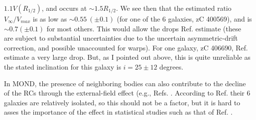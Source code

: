 \documentclass[twocolumn,showpacs,amsmath,amssymb,prd,nofootinbib]
{revtex4}
\def\sss{\scriptscriptstyle}
\def\_#1{_{\sss #1}}
\def\vinf{V_{\infty}}
\def\raf{R\_{1/2}}
\begin{document}
$1.1V(\raf)$, and occurs at $\sim 1.5 \raf$. We see then that the estimated ratio $\vinf/V_{max}$ is as low as $\sim 0.55~ (\pm 0.1)$ (for one of the 6 galaxies, zC 400569), and is $\sim 0.7 (\pm 0.1)$ for most others. This would allow the drops Ref. \cite{genzel17} estimate (these are subject to substantial uncertainties due to the uncertain asymmetric-drift correction, and possible unaccounted for warps). For one galaxy, zC 406690, Ref. \cite{genzel17} estimate a very large drop. But, as I pointed out above, this is quite unreliable as the stated inclination for this galaxy is $i=25\pm 12$ degrees.
\par
In MOND, the presence of neighboring bodies can also contribute to the decline of the RCs through the external-field effect (e.g., Refs. \cite{milgrom83a,wu15,haghi16,mcgaugh16}. According to Ref. \cite{genzel17} their 6 galaxies are relatively isolated, so this should not be a factor, but it is hard to asses the importance of the effect in statistical studies such as that of Ref. \cite{lang17}.
\end{document}
